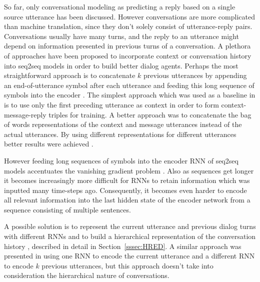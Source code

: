 \documentclass[12pt]{article}
\begin{document}
So far, only conversational modeling as predicting a reply based on a single source utterance has been discussed. However conversations are more complicated than machine translation, since they don't solely consist of utterance-reply pairs. Conversations usually have many turns, and the reply to an utterance might depend on information presented in previous turns of a conversation. A plethora of approaches have been proposed to incorporate context or conversation history into seq2seq models in order to build better dialog agents. Perhaps the most straightforward approach is to concatenate \(k\) previous utterances by appending an end-of-utterance symbol after each utterance and feeding this long sequence of symbols into the encoder \cite{Vinyals:2015}. The simplest approach which was used as a baseline in \cite{Sordoni:2015} is to use only the first preceding utterance as context in order to form context-message-reply triples for training. A better approach was to concatenate the bag of words representations of the context and message utterances instead of the actual utterances. By using different representations for different utterances better results were achieved \cite{Sordoni:2015}.

However feeding long sequences of symbols into the encoder RNN of seq2seq models accentuates the vanishing gradient problem \cite{Hochreiter:1998}. Also as sequences get longer it becomes increasingly more difficult for RNNs to retain information which was inputted many time-steps ago. Consequently, it becomes even harder to encode all relevant information into the last hidden state of the encoder network from a sequence consisting of multiple sentences.

A possible solution is to represent the current utterance and previous dialog turns with different RNNs and to build a hierarchical representation of the conversation history \cite{Serban:2015}, described in detail in Section~\ref{sssec:HRED}. A similar approach was presented in \cite{Zhaob:2017} using one RNN to encode the current utterance and a different RNN to encode \(k\) previous utterances, but this approach doesn't take into consideration the hierarchical nature of conversations.
 
\end{document}
